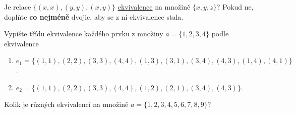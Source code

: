 \begin{exercise}
  Je relace $\{(x, x), (y, y), (x, y)\}$
  \hyperref[def:relace-ekvivalence]{ekvivalence} na množině $\{x, y, z\}$? Pokud
  ne, doplňte \textbf{co nejméně} dvojic, aby se z ní ekvivalence stala.
\end{exercise}
\lessboxspace
\begin{exercise}
  Vypište třídu ekvivalence každého prvku z množiny $a = \{1, 2, 3, 4\}$ podle
  ekvivalence
  \begin{enumerate}[label=(\alph*)]
    \item $e_1 = \{(1, 1), (2, 2), (3, 3), (4, 4), (1, 3), (3, 1), (3, 4), (4,
      3), (1, 4), (4, 1)\}$.
    \item $e_2 = \{(1, 1), (2, 2), (3, 3), (4, 4), (1, 2), (2, 1), (3, 4), (4,
      3)\}$.
  \end{enumerate}
\end{exercise}
\lessboxspace
\begin{hardExercise}
  Kolik je různých ekvivalencí na množině $a = \{1, 2, 3, 4, 5, 6, 7, 8, 9\}$?
\end{hardExercise}

